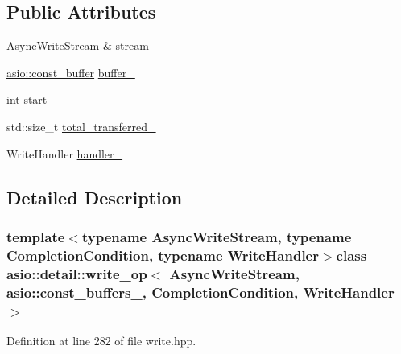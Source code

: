 \subsection*{Public Attributes}
\begin{DoxyCompactItemize}
\item 
Async\+Write\+Stream \& \hyperlink{classasio_1_1detail_1_1write__op_3_01_async_write_stream_00_01asio_1_1const__buffers__1_00_01_014e1524567dd7f87180ace12b51858864_ab5f1b6c80007644c91fcefd60c89d709}{stream\+\_\+}
\item 
\hyperlink{classasio_1_1const__buffer}{asio\+::const\+\_\+buffer} \hyperlink{classasio_1_1detail_1_1write__op_3_01_async_write_stream_00_01asio_1_1const__buffers__1_00_01_014e1524567dd7f87180ace12b51858864_a4fa8af2eb0ed4e2737effe658e4aae92}{buffer\+\_\+}
\item 
int \hyperlink{classasio_1_1detail_1_1write__op_3_01_async_write_stream_00_01asio_1_1const__buffers__1_00_01_014e1524567dd7f87180ace12b51858864_a713a588c87a9dcd3876061cd47f2e2cc}{start\+\_\+}
\item 
std\+::size\+\_\+t \hyperlink{classasio_1_1detail_1_1write__op_3_01_async_write_stream_00_01asio_1_1const__buffers__1_00_01_014e1524567dd7f87180ace12b51858864_a98fa5c46004ef5815ca9b1453d738288}{total\+\_\+transferred\+\_\+}
\item 
Write\+Handler \hyperlink{classasio_1_1detail_1_1write__op_3_01_async_write_stream_00_01asio_1_1const__buffers__1_00_01_014e1524567dd7f87180ace12b51858864_a729cb8777b160fe9b1595ec3c8b82209}{handler\+\_\+}
\end{DoxyCompactItemize}


\subsection{Detailed Description}
\subsubsection*{template$<$typename Async\+Write\+Stream, typename Completion\+Condition, typename Write\+Handler$>$class asio\+::detail\+::write\+\_\+op$<$ Async\+Write\+Stream, asio\+::const\+\_\+buffers\+\_,                           Completion\+Condition, Write\+Handler $>$}



Definition at line 282 of file write.\+hpp.




